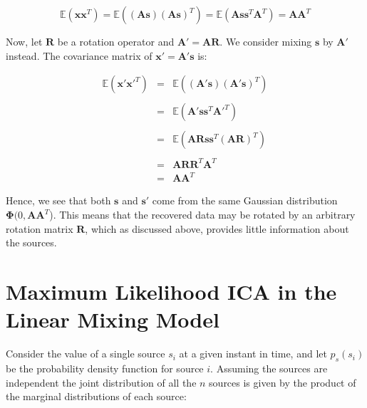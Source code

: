 \documentclass[11pt, oneside, a4paper]{report}
\begin{document}
    \begin{equation}
      \mathbb{E}(\boldsymbol{x}\boldsymbol{x}^T) 
      = \mathbb{E}((\boldsymbol{A}\boldsymbol{s})(\boldsymbol{A}\boldsymbol{s})^T) = \mathbb{E}(\boldsymbol{A}\boldsymbol{s}\boldsymbol{s}^T\boldsymbol{A}^T)=\boldsymbol{A}\boldsymbol{A}^T      
    \end{equation}

Now, let $\boldsymbol{R}$ be a rotation operator and $\boldsymbol{A}'
= \boldsymbol{AR}$. We consider mixing $\boldsymbol{s}$ by
$\boldsymbol{A}'$ instead. The covariance matrix of  
$\boldsymbol{x}' = \boldsymbol{A}'\boldsymbol{s}$ is:


\begin{equation}
  \begin{array}{lcl}
    \mathbb{E}(\boldsymbol{x}'\boldsymbol{x}'^T) & = &
    \mathbb{E}((\boldsymbol{A}'\boldsymbol{s})(\boldsymbol{A}'\boldsymbol{s})^T) \\
    \\& = & \mathbb{E}(\boldsymbol{A}'\boldsymbol{s}\boldsymbol{s}^T\boldsymbol{A}'^T) \\
    \\& = & \mathbb{E}(\boldsymbol{A}\boldsymbol{R}\boldsymbol{s}\boldsymbol{s}^T(\boldsymbol{A}\boldsymbol{R})^T) \\
    \\& = & \boldsymbol{A}\boldsymbol{R}\boldsymbol{R}^T\boldsymbol{A}^T
    \\& = & \boldsymbol{A}\boldsymbol{A}^T
  \end{array}
\end{equation}

Hence, we see that both $\boldsymbol{s}$ and $\boldsymbol{s}'$ come
from the same Gaussian distribution $\boldsymbol{\Phi}(0,
\boldsymbol{A}\boldsymbol{A}^T$). This means that the recovered data
may be rotated by an arbitrary rotation matrix $\boldsymbol{R}$, which
as discussed above, provides little information about the sources. 


\section{Maximum Likelihood ICA in the Linear Mixing Model}\label{linear_model_ica}

Consider the value of a single source $s_i$ at a given instant in time, and
let $p_s(s_i)$ be the probability density function for source $i$. Assuming the 
sources are independent the joint distribution of all the $n$ sources is given 
by the product of the marginal distributions of each source:
\end{document}
